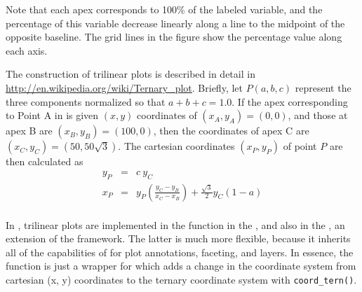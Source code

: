 \documentclass[11pt]{book}\usepackage[]{graphicx}\usepackage[]{color}
\begin{document}
Note that each apex corresponds to 100\% of the labeled
variable, and the percentage of this variable decrease
linearly along a line to the midpoint of the opposite
baseline.
The grid lines in the figure show the percentage value along
each axis.

The construction of trilinear plots is described in detail
in \url{http://en.wikipedia.org/wiki/Ternary_plot}.
Briefly, let $P(a, b, c)$ represent the three components  normalized so
that $a + b + c = 1.0$.
If the apex corresponding to Point A in 
is given $(x, y)$ coordinates of $(x_A, y_A) = (0, 0)$,
and those at apex B are $(x_B, y_B) = (100, 0)$,
then the coordinates of apex C are $(x_C, y_C) = (50, 50\sqrt{3})$.
The cartesian coordinates $(x_P, y_P)$  of point $P$ are then calculated as
\begin{eqnarray*}
y_P & = & c \: y_C \\
x_P & = & y_P \left( \frac{y_C - y_B}{x_C - x_B} \right)
+ \frac{\sqrt{3}}{2} y_C (1 - a) \\
\end{eqnarray*}

In \R, trilinear plots are implemented in the
 function in the ,
and also in the , an extension of
the  framework.  The latter is much more
flexible, because it inherits all of the capabilities
of  for plot annotations, faceting, and layers.
In essence,
the function  is just a wrapper for
 which adds a change in the coordinate
system from cartesian (x, y) coordinates to the
ternary coordinate system with \verb|coord_tern()|.
\end{document}
